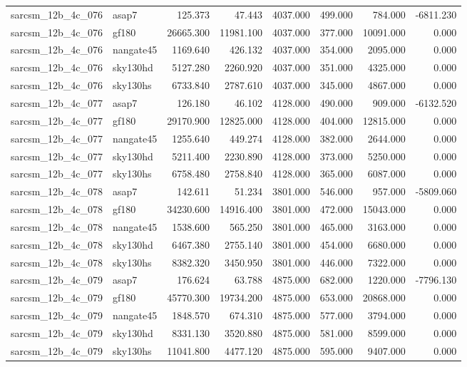 \begin{tabular}{llrrrrrr}
sarcsm\_12b\_4c\_076 & asap7 & 125.373 & 47.443 & 4037.000 & 499.000 & 784.000 & -6811.230 \\
sarcsm\_12b\_4c\_076 & gf180 & 26665.300 & 11981.100 & 4037.000 & 377.000 & 10091.000 & 0.000 \\
sarcsm\_12b\_4c\_076 & nangate45 & 1169.640 & 426.132 & 4037.000 & 354.000 & 2095.000 & 0.000 \\
sarcsm\_12b\_4c\_076 & sky130hd & 5127.280 & 2260.920 & 4037.000 & 351.000 & 4325.000 & 0.000 \\
sarcsm\_12b\_4c\_076 & sky130hs & 6733.840 & 2787.610 & 4037.000 & 345.000 & 4867.000 & 0.000 \\
sarcsm\_12b\_4c\_077 & asap7 & 126.180 & 46.102 & 4128.000 & 490.000 & 909.000 & -6132.520 \\
sarcsm\_12b\_4c\_077 & gf180 & 29170.900 & 12825.000 & 4128.000 & 404.000 & 12815.000 & 0.000 \\
sarcsm\_12b\_4c\_077 & nangate45 & 1255.640 & 449.274 & 4128.000 & 382.000 & 2644.000 & 0.000 \\
sarcsm\_12b\_4c\_077 & sky130hd & 5211.400 & 2230.890 & 4128.000 & 373.000 & 5250.000 & 0.000 \\
sarcsm\_12b\_4c\_077 & sky130hs & 6758.480 & 2758.840 & 4128.000 & 365.000 & 6087.000 & 0.000 \\
sarcsm\_12b\_4c\_078 & asap7 & 142.611 & 51.234 & 3801.000 & 546.000 & 957.000 & -5809.060 \\
sarcsm\_12b\_4c\_078 & gf180 & 34230.600 & 14916.400 & 3801.000 & 472.000 & 15043.000 & 0.000 \\
sarcsm\_12b\_4c\_078 & nangate45 & 1538.600 & 565.250 & 3801.000 & 465.000 & 3163.000 & 0.000 \\
sarcsm\_12b\_4c\_078 & sky130hd & 6467.380 & 2755.140 & 3801.000 & 454.000 & 6680.000 & 0.000 \\
sarcsm\_12b\_4c\_078 & sky130hs & 8382.320 & 3450.950 & 3801.000 & 446.000 & 7322.000 & 0.000 \\
sarcsm\_12b\_4c\_079 & asap7 & 176.624 & 63.788 & 4875.000 & 682.000 & 1220.000 & -7796.130 \\
sarcsm\_12b\_4c\_079 & gf180 & 45770.300 & 19734.200 & 4875.000 & 653.000 & 20868.000 & 0.000 \\
sarcsm\_12b\_4c\_079 & nangate45 & 1848.570 & 674.310 & 4875.000 & 577.000 & 3794.000 & 0.000 \\
sarcsm\_12b\_4c\_079 & sky130hd & 8331.130 & 3520.880 & 4875.000 & 581.000 & 8599.000 & 0.000 \\
sarcsm\_12b\_4c\_079 & sky130hs & 11041.800 & 4477.120 & 4875.000 & 595.000 & 9407.000 & 0.000 \\

\end{tabular}
